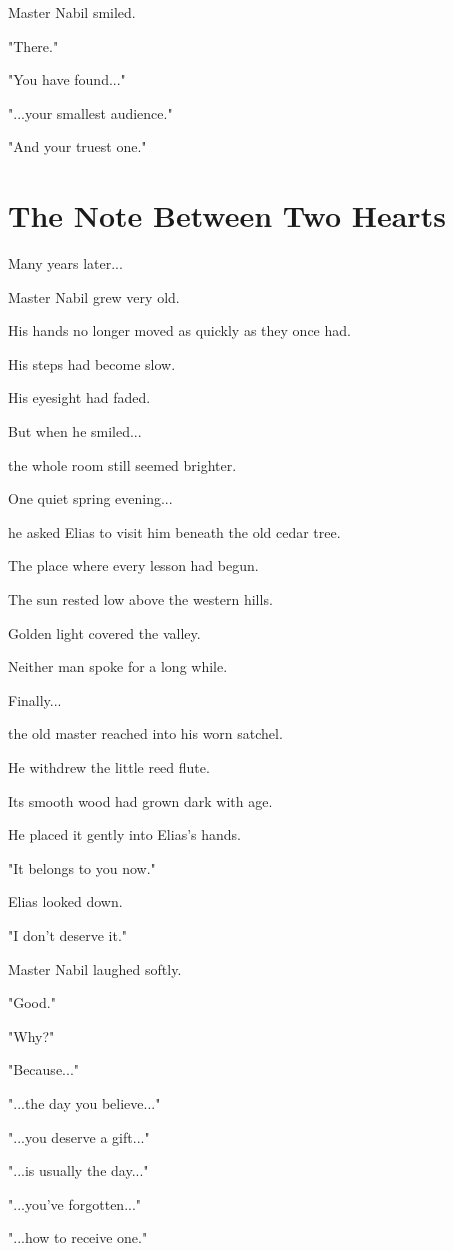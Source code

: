 \documentclass[12pt,openany]{book}
\begin{document}
Master Nabil smiled.

"There."

"You have found..."

"...your smallest audience."

"And your truest one."
\section*{The Note Between Two Hearts}

Many years later...

Master Nabil grew very old.

His hands no longer moved as quickly as they once had.

His steps had become slow.

His eyesight had faded.

But when he smiled...

the whole room still seemed brighter.

One quiet spring evening...

he asked Elias to visit him beneath the old cedar tree.

The place where every lesson had begun.

The sun rested low above the western hills.

Golden light covered the valley.

Neither man spoke for a long while.

Finally...

the old master reached into his worn satchel.

He withdrew the little reed flute.

Its smooth wood had grown dark with age.

He placed it gently into Elias's hands.

"It belongs to you now."

Elias looked down.

"I don't deserve it."

Master Nabil laughed softly.

"Good."

"Why?"

"Because..."

"...the day you believe..."

"...you deserve a gift..."

"...is usually the day..."

"...you've forgotten..."

"...how to receive one."
\end{document}
